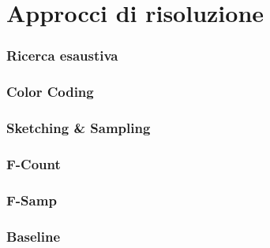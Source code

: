 \section{Approcci di risoluzione}

\begin{frame}
	\sectionpage
	\centering
\end{frame}

\begin{frame}
	\frametitle{Ricerca esaustiva}
	\centering
\end{frame}

\begin{frame}
	\frametitle{Color Coding}
	\centering
\end{frame}

\begin{frame}
	\frametitle{Sketching \& Sampling}
	\centering
\end{frame}

\begin{frame}
	\frametitle{F-Count}
	\centering
\end{frame}

\begin{frame}
	\frametitle{F-Samp}
	\centering
\end{frame}

\begin{frame}
	\frametitle{Baseline}
	\centering
\end{frame}
